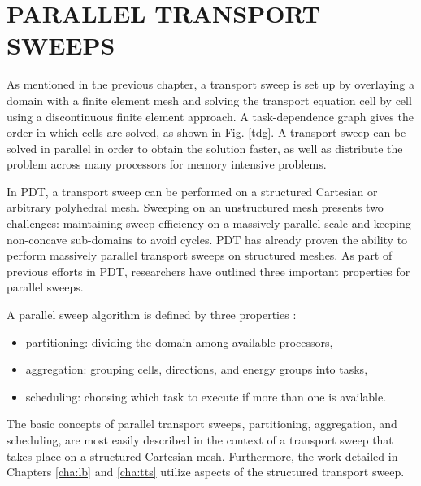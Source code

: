 %
%
%
%



\chapter{PARALLEL TRANSPORT SWEEPS}
As mentioned in the previous chapter, a transport sweep is set up by overlaying a domain with a finite element mesh and solving the transport equation cell by cell using a discontinuous finite element approach. A task-dependence graph gives the order in which cells are solved, as shown in Fig. \ref{tdg}. A transport sweep can be solved in parallel in order to obtain the solution faster, as well as distribute the problem across many processors for memory intensive problems. 

In PDT, a transport sweep can be performed on a structured Cartesian or arbitrary polyhedral mesh. Sweeping on an unstructured mesh presents two challenges: maintaining sweep efficiency on a massively parallel scale and keeping non-concave sub-domains to avoid cycles. PDT has already proven the ability to perform massively parallel transport sweeps on structured meshes. As part of previous efforts in PDT, researchers have outlined three important properties for parallel sweeps. 

A parallel sweep algorithm is defined by three properties \cite{mpadams2013} :
\begin{itemize}
\item partitioning: dividing the domain among available processors,
\item aggregation: grouping cells, directions, and energy groups into tasks,
\item scheduling: choosing which task to execute if more than one is available.
\end{itemize}

The basic concepts of parallel transport sweeps, partitioning, aggregation, and scheduling, are most easily described in the context of a  transport sweep that takes place on a structured Cartesian mesh. Furthermore, the work detailed in Chapters \ref{cha:lb} and \ref{cha:tts} utilize aspects of the structured transport sweep.

